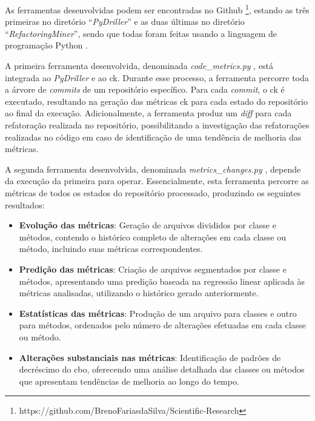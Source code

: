 As ferramentas desenvolvidas podem ser encontradas no Github \footnote{https://github.com/BrenoFariasdaSilva/Scientific-Research}, estando as três primeiras no diretório ``\textit{PyDriller}'' e as duas últimas no diretório ``\textit{RefactoringMiner}'', sendo que todas foram feitas usando a linguagem de programação Python \cite{PythonProgrammingLanguage}.

A primeira ferramenta desenvolvida, denominada \textit{code\_metrics.py} \cite{PyDriller:CodeMetrics:2023}, está integrada ao \textit{PyDriller} e ao \gls{ck}. Durante esse processo, a ferramenta percorre toda a árvore de \textit{commits} de um repositório específico. Para cada \textit{commit}, o \gls{ck} é executado, resultando na geração das métricas \gls{ck} para cada estado do repositório ao final da execução. Adicionalmente, a ferramenta produz um \textit{diff} para cada refatoração realizada no repositório, possibilitando a investigação das refatorações realizadas no código em caso de identificação de uma tendência de melhoria das métricas.

A segunda ferramenta desenvolvida, denominada \textit{metrics\_changes.py} \cite{PyDriller:MetricsChanges:2023},  depende da execução da primeira para operar. Essencialmente, esta ferramenta percorre as métricas de todos os estados do repositório processado, produzindo os seguintes resultados:

\begin{itemize}
    \item \textbf{Evolução das métricas}: Geração de arquivos divididos por classe e métodos, contendo o histórico completo de alterações em cada classe ou método, incluindo suas métricas correspondentes.
    \item \textbf{Predição das métricas}: Criação de arquivos segmentados por classe e métodos, apresentando uma predição baseada na regressão linear aplicada às métricas analisadas, utilizando o histórico gerado anteriormente.
    \item \textbf{Estatísticas das métricas}: Produção de um arquivo para classes e outro para métodos, ordenados pelo número de alterações efetuadas em cada classe ou método.
    \item \textbf{Alterações substanciais nas métricas}: Identificação de padrões de decréscimo do \gls{cbo}, oferecendo uma análise detalhada das classes ou métodos que apresentam tendências de melhoria ao longo do tempo.
\end{itemize}

